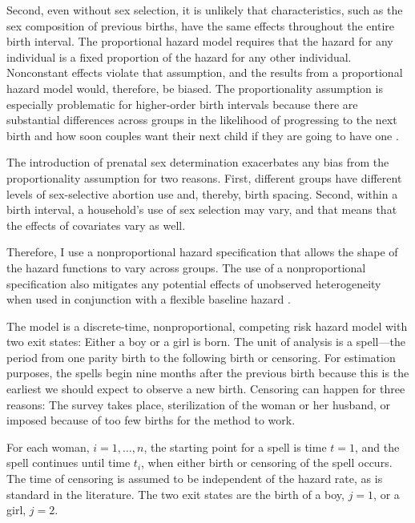 \documentclass[12pt,letterpaper]{article}
\begin{document}
Second, even without sex selection, it is unlikely that characteristics, such as 
the sex composition of previous births, have the same effects throughout the entire 
birth interval. 
The proportional hazard model requires that the hazard for any individual is a 
fixed proportion of the hazard for any other individual. 
Nonconstant effects violate that assumption, and the results from a proportional hazard 
model would, therefore, be biased. 
The proportionality assumption is especially problematic for higher-order birth 
intervals because there are substantial differences across groups in the likelihood 
of progressing to the next birth and how soon couples want their next child if they 
are going to have one \citep{Whitworth2002,Bhalotra2008,Kim2010}.

The introduction of prenatal sex determination exacerbates any bias from
the proportionality assumption for two reasons. 
First, different groups have different levels of sex-selective abortion use and, thereby, 
birth spacing. 
Second, within a birth interval, a household's use of sex selection may vary, and that
means that the effects of covariates vary as well.

Therefore, I use a nonproportional hazard specification that allows the shape of the 
hazard functions to vary across groups.
The use of a nonproportional specification also mitigates any potential effects 
of unobserved heterogeneity when used in conjunction with a flexible baseline hazard 
\citep{Dolton1995}.

The model is a discrete-time, nonproportional, competing risk hazard model with two 
exit states: Either a boy or a girl is born. 
The unit of analysis is a spell---the period from one parity birth to the following 
birth or censoring. 
For estimation purposes, the spells begin nine months after the previous birth because 
this is the earliest we should expect to observe a new birth. 
Censoring can happen for three reasons: The survey takes place, sterilization of the 
woman or her husband, or imposed because of too few births for the method to work.

For each woman, $i=1,\ldots,n$, the starting point for a spell is time $t=1$, and 
the spell continues until time $t_i$, when either birth or censoring of the spell 
occurs.
The time of censoring is assumed to be independent of the hazard rate,
as is standard in the literature.
The two exit states are the birth of a boy, $j=1$, or a girl, $j=2$.
\end{document}
